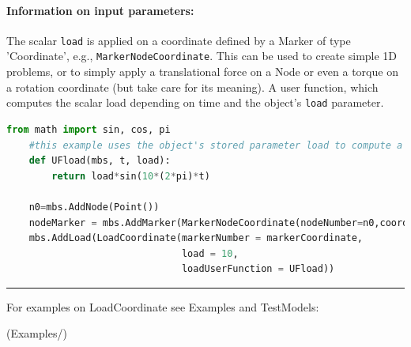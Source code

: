 \paragraph{Information on input parameters:} 
\finishTable
 \noindent
    The scalar \texttt{load} is applied on a coordinate defined by a Marker of type 'Coordinate', e.g., \texttt{MarkerNodeCoordinate}.
    This can be used to create simple 1D problems, or to simply apply a translational force on a Node or even a torque
    on a rotation coordinate (but take care for its meaning).
    A user function, which computes the scalar load depending on time and the object's \texttt{load} parameter.
    \finishTable
    \userFunctionExample{}
    \pythonstyle
    \begin{lstlisting}[language=Python]
    from math import sin, cos, pi
    #this example uses the object's stored parameter load to compute a time-dependent load
    def UFload(mbs, t, load): 
        return load*sin(10*(2*pi)*t)

    n0=mbs.AddNode(Point())
    nodeMarker = mbs.AddMarker(MarkerNodeCoordinate(nodeNumber=n0,coordinate=0))
    mbs.AddLoad(LoadCoordinate(markerNumber = markerCoordinate,
                               load = 10,
                               loadUserFunction = UFload))
    \end{lstlisting}
\vspace{6pt}\par\noindent\rule{\textwidth}{0.4pt}
%
\noindent For examples on LoadCoordinate see Examples and TestModels:
\bi
\item {} (Examples/)
